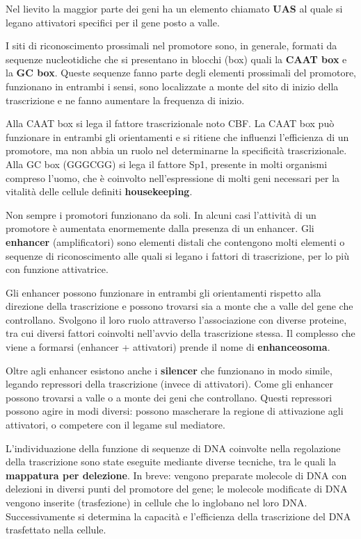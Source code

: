 \documentclass[11pt]{book}
\begin{document}
Nel lievito la maggior parte dei geni ha un elemento chiamato
\textbf{UAS} al quale si legano attivatori specifici per il gene posto a
valle.

I siti di riconoscimento prossimali nel promotore sono, in generale,
formati da sequenze nucleotidiche che si presentano in blocchi (box)
quali la \textbf{CAAT box} e la \textbf{GC box}. Queste sequenze fanno
parte degli elementi prossimali del promotore, funzionano in entrambi i
sensi, sono localizzate a monte del sito di inizio della trascrizione e
ne fanno aumentare la frequenza di inizio.

Alla CAAT box si lega il fattore trascrizionale noto CBF. La CAAT box
può funzionare in entrambi gli orientamenti e si ritiene che influenzi
l'efficienza di un promotore, ma non abbia un ruolo nel determinarne la
specificità trascrizionale. Alla GC box (GGGCGG) si lega il fattore Sp1,
presente in molti organismi compreso l'uomo, che è coinvolto
nell'espressione di molti geni necessari per la vitalità delle cellule
definiti \textbf{housekeeping}.

Non sempre i promotori funzionano da soli. In alcuni casi l'attività di
un promotore è aumentata enormemente dalla presenza di un enhancer. Gli
\textbf{enhancer} (amplificatori) sono elementi distali che contengono
molti elementi o sequenze di riconoscimento alle quali si legano i
fattori di trascrizione, per lo più con funzione attivatrice.

Gli enhancer possono funzionare in entrambi gli orientamenti rispetto
alla direzione della trascrizione e possono trovarsi sia a monte che a
valle del gene che controllano. Svolgono il loro ruolo attraverso
l'associazione con diverse proteine, tra cui diversi fattori coinvolti
nell'avvio della trascrizione stessa. Il complesso che viene a formarsi
(enhancer + attivatori) prende il nome di \textbf{enhanceosoma}.

Oltre agli enhancer esistono anche i \textbf{silencer} che funzionano in
modo simile, legando repressori della trascrizione (invece di
attivatori). Come gli enhancer possono trovarsi a valle o a monte dei
geni che controllano. Questi repressori possono agire in modi diversi:
possono mascherare la regione di attivazione agli attivatori, o
competere con il legame sul mediatore.

L'individuazione della funzione di sequenze di DNA coinvolte nella
regolazione della trascrizione sono state eseguite mediante diverse
tecniche, tra le quali la \textbf{mappatura per delezione}. In breve:
vengono preparate molecole di DNA con delezioni in diversi punti del
promotore del gene; le molecole modificate di DNA vengono inserite
(trasfezione) in cellule che lo inglobano nel loro DNA. Successivamente
si determina la capacità e l'efficienza della trascrizione del DNA
trasfettato nella cellule.
\end{document}
